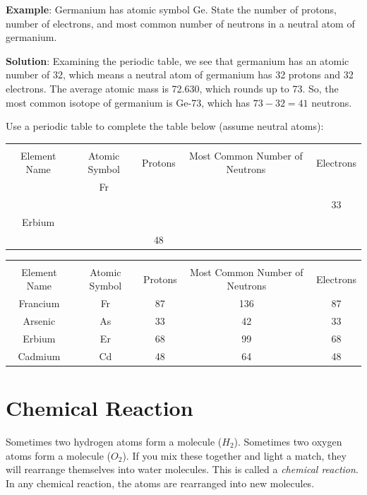 \textbf{Example}: Germanium has atomic symbol Ge. State the number of protons, 
number of electrons, and most common number of neutrons in a neutral atom of 
germanium. 

\textbf{Solution}: Examining the periodic table, we see that germanium has an 
atomic number of 32, which means a neutral atom of germanium has 32 protons and
32 electrons. The average atomic mass is 72.630, which rounds up to 73. So, the
most common isotope of germanium is Ge-73, which has $73 - 32 = 41$ neutrons.

\begin{Exercise}[title = {Determining Numbers of Subatomic Particles}, label = pne]
Use a periodic table to complete the table below (assume neutral atoms): %

\begin{tabular}{|c|c|c|c|c|}
\hline\\
Element Name & Atomic Symbol & Protons & Most Common Number of Neutrons & Electrons\\\hline
 & Fr & & & \\\hline
 & & & & 33\\\hline
 Erbium & & & & \\\hline
  & & 48 & & \\\hline
\end{tabular}
\end{Exercise}

\begin{Answer}[ref = pne]
\begin{tabular}{|c|c|c|c|c|}
\hline\\
Element Name & Atomic Symbol & Protons & Most Common Number of Neutrons & Electrons\\\hline
 Francium & Fr & 87 & 136 & 87 \\\hline
 Arsenic & As & 33 & 42 & 33 \\\hline
 Erbium & Er & 68 & 99 & 68 \\\hline
 Cadmium & Cd & 48 & 64 & 48 \\\hline
\end{tabular}
\end{Answer}

\section{Chemical Reaction}

Sometimes two hydrogen atoms form a molecule ($H_2$). Sometimes two oxygen 
atoms form a molecule ($O_2$). If you mix these together and light a match, 
they will rearrange themselves into water molecules. This is called a \textit{
chemical reaction}. In any chemical reaction, the atoms are rearranged into new
molecules.

